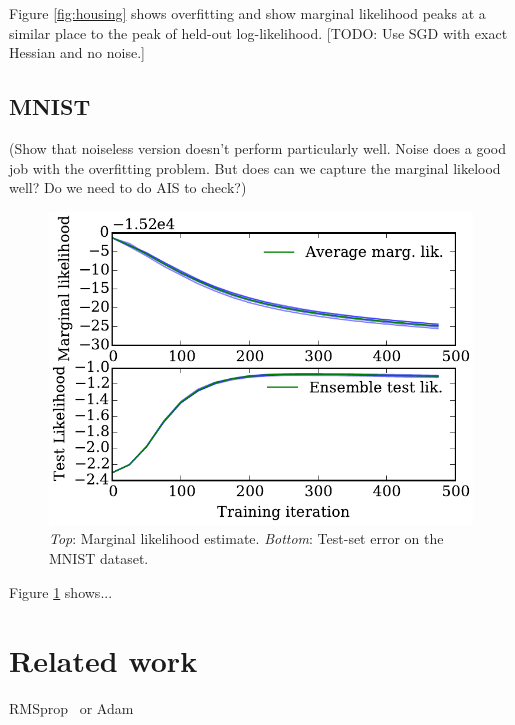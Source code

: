 \documentclass[]{article}
\begin{document}
Figure \ref{fig:housing} shows overfitting and show marginal likelihood peaks at a similar place to the peak of held-out log-likelihood.
[TODO: Use SGD with exact Hessian and no noise.]


\subsection{MNIST}
(Show that noiseless version doesn't perform particularly well. Noise does a
good job with the overfitting problem. But does can we capture the marginal
likelood well? Do we need to do AIS to check?)

\begin{figure}
\begin{center}
\includegraphics[width=\columnwidth]{../experiments/2015_02_27_first_entropic_sgd/6_ensemble/ensemble}
\vskip -0.1in
\caption{\emph{Top}: Marginal likelihood estimate.
\emph{Bottom}: Test-set error on the MNIST dataset.}
\label{fig:ensemble}
\end{center}
\end{figure}

Figure \ref{fig:ensemble} shows...

\section{Related work}

RMSprop~\cite{Tieleman2012} or Adam~\citep{Adam14}
\end{document}
